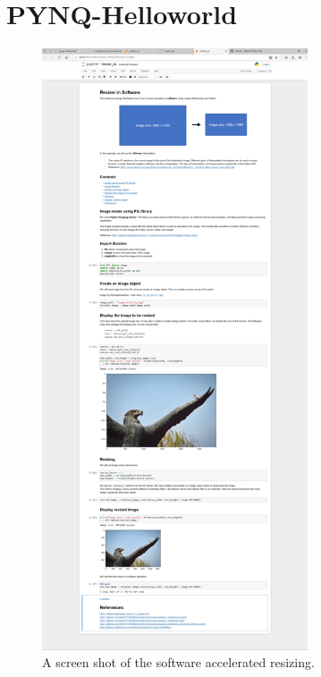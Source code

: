 \documentclass[a4paper]{article}
\begin{document}
\section{PYNQ-Helloworld}
\begin{figure}[H]
    \centering
    \includegraphics[width=0.7\textwidth]{3.png}
    \caption{A screen shot of the software accelerated resizing.}
\end{figure}
\end{document}
